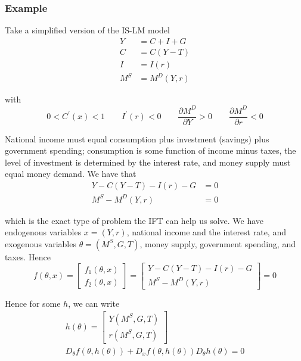 \documentclass{article}
\begin{document}
\subsubsection{Example}
\label{ssub:example}

Take a simplified version of the IS-LM model
\begin{align*}
  Y   & = C + I + G   \\
  C   & = C(Y - T)    \\
  I   & = I(r)        \\
  M^S & = M^D(Y, r)
\end{align*}

with
\[
  0 < C^\prime(x) < 1
  \quad\quad
  I^\prime(r) < 0
  \quad\quad
  \dfrac{\partial M^D}{\partial Y} > 0
  \quad\quad
  \dfrac{\partial M^D}{\partial r} < 0
\]

National income must equal consumption plus investment (savings) plus government spending; consumption is some function of income minus taxes, the level of investment is determined by the interest rate, and money supply must equal money demand.  We have that
\begin{align*}
  Y - C(Y - T) - I(r) - G & = 0 \\
  M^S - M^D (Y, r)        & = 0
\end{align*}

which is the exact type of problem the IFT can help us solve. We have endogenous variables $x = (Y, r)$, national income and the interest rate, and exogenous variables $\theta = (M^S, G, T)$, money supply, government spending, and taxes. Hence
\begin{equation}
 \label{eq:is_lm_example}
  f(\theta, x)
  =
  \left[\begin{matrix}
    f_1(\theta, x) \\
    f_2(\theta, x)
  \end{matrix}\right]
  =
  \left[\begin{matrix}
    Y - C(Y - T) - I(r) - G \\
    M^S - M^D (Y, r)
  \end{matrix}\right]
  = 0
\end{equation}

Hence for some $h$, we can write
\begin{equation}
  \begin{array}{c}
    h(\theta)
    = \left[\begin{matrix}
      Y(M^S, G, T) \\
      r(M^S, G, T)
    \end{matrix}\right] \\[6pt]
    D_\theta f(\theta, h(\theta)) + D_x f(\theta, h(\theta)) D_\theta h(\theta) = 0
  \end{array}
  \nonumber
\end{equation}
\end{document}
